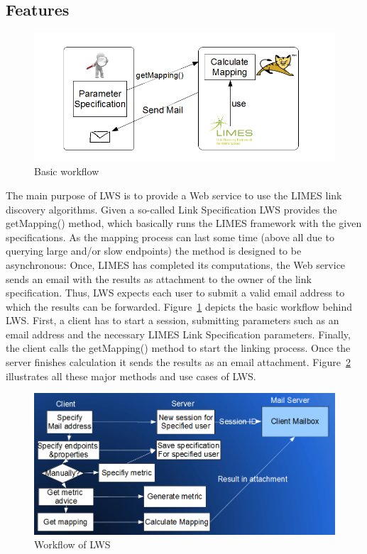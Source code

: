 \documentclass{article}
\begin{document}
\subsection{Features}
\begin{figure}[htbp]
	\centering
		\includegraphics[width=7in]{images/limes_webservice_workflow_skizze_for_dummies.png}
	\caption{Basic workflow}
	\label{fig:limes_webservice_workflow_skizze_for_dummies}
\end{figure}
The main purpose of LWS is to provide a Web service to use the LIMES link discovery algorithms. Given a so-called Link Specification LWS provides the getMapping() method, which basically runs the LIMES framework with the given specifications. As the mapping process can last some time (above all due to querying large and/or slow endpoints) the method is designed to be asynchronous: Once, LIMES has completed its computations, the Web service sends an email with the results as attachment to the owner of the link specification. 
Thus, LWS expects each user to submit a valid email address to which the results can be forwarded.
Figure~\ref{fig:limes_webservice_workflow_skizze_for_dummies} depicts the basic workflow behind LWS. 
First, a client has to start a session, submitting parameters such as an email address and the necessary LIMES Link Specification parameters. 
Finally, the client calls the getMapping() method to start the linking process. 
Once the server finishes calculation it sends the results as an email attachment. 
Figure~\ref{fig:workflow2} illustrates all these major methods and use cases of LWS.
\begin{figure}[h]
	\centering
		\includegraphics[width=7in]{images/workflow2.png}
	\caption{Workflow of LWS}
	\label{fig:workflow2}
\end{figure}
\end{document}
